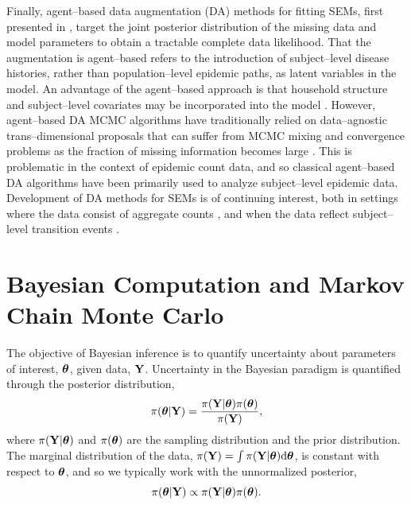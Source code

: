 Finally, agent--based data augmentation (DA) methods for fitting SEMs, first presented in \cite{gibson1998,oneill1999}, target the joint posterior distribution of the missing data and model parameters to obtain a tractable complete data likelihood. That the augmentation is agent--based refers to the introduction of subject--level disease histories, rather than population--level epidemic paths, as latent variables in the model. An advantage of the agent--based approach is that household structure and subject--level covariates may be incorporated into the model \cite{auranen2000,hohle2002,cauchemez2004bayesian, neal2004statistical,oneill2009}. However, agent--based DA MCMC algorithms have traditionally relied on data--agnostic trans--dimensional proposals that can suffer from MCMC mixing and convergence problems as the fraction of missing information becomes large \cite{roberts2001, mckinley2014simulation, pooley2015}. This is problematic in the context of epidemic count data, and so classical agent--based DA algorithms have been primarily used to analyze subject--level epidemic data. Development of DA methods for SEMs is of continuing interest, both in settings where the data consist of aggregate counts \cite{pooley2015,QinShe15,shestopaloff2016sampling}, and when the data reflect subject--level transition events \cite{kypraios2018bayesian,xu2016bayesian}.

\section{Bayesian Computation and Markov Chain Monte Carlo}
\label{sec:bayesian_computation}

The objective of Bayesian inference is to quantify uncertainty about parameters of interest, $\boldsymbol{\theta} $, given data, $\mathbf{Y}$. Uncertainty in the Bayesian paradigm is quantified through the posterior distribution, $$\pi(\boldsymbol{\theta}|\mathbf{Y})=\frac{\pi(\mathbf{Y}|\boldsymbol{\theta})\pi(\boldsymbol{\theta})}{\pi(\mathbf{Y})},$$
where $ \pi(\mathbf{Y}|\boldsymbol{\theta}) $ and $ \pi(\boldsymbol{\theta}) $ are the sampling distribution and the prior distribution. The marginal distribution of the data, $ \pi(\mathbf{Y}) = \int\pi(\mathbf{Y}|\boldsymbol{\theta})\mathrm{d}\boldsymbol{\theta} $, is constant with respect to $ \boldsymbol{\theta} $, and so we typically work with the unnormalized posterior, $$ \pi(\boldsymbol{\theta}|\mathbf{Y})\propto\pi(\mathbf{Y}|\boldsymbol{\theta})\pi(\boldsymbol{\theta}). $$

